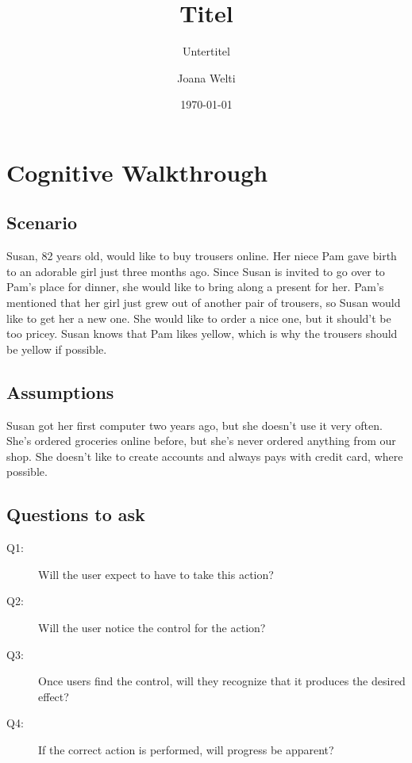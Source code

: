 \documentclass[fontsize=12pt,paper=a4]{scrartcl}
\begin{document}
\title{Titel}
\subtitle{Untertitel}
\date{\today}
\author{Joana Welti}
\maketitle

\section{Cognitive Walkthrough}

\subsection{Scenario}
Susan, 82 years old, would like to buy trousers online. Her niece Pam gave birth to an adorable girl just three months ago. Since Susan is invited to go over to Pam's place for dinner, she would like to bring along a present for her. Pam's mentioned that her girl just grew out of another pair of trousers, so Susan would like to get her a new one. She would like to order a nice one, but it should't be too pricey. Susan knows that Pam likes yellow, which is why the trousers should be yellow if possible. 

\subsection{Assumptions}
Susan got her first computer two years ago, but she doesn't use it very often. She's ordered groceries online before, but she's never ordered anything from our shop.
She doesn't like to create accounts and always pays with credit card, where possible.

\subsection{Questions to ask}
\begin{description}
\item[Q1:] Will the user expect to have to take this action?
\item[Q2:] Will the user notice the control for the action?
\item[Q3:] Once users find the control, will they recognize that it produces the desired effect?
\item[Q4:] If the correct action is performed, will progress be apparent?
\end{description}
 
\end{document}
